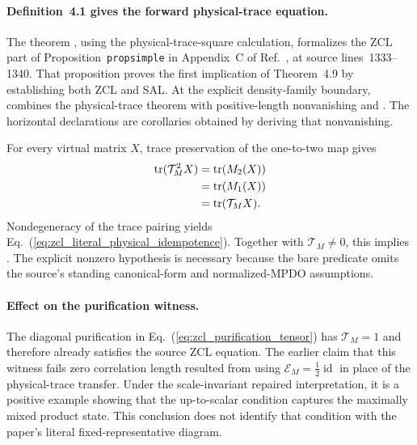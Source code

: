 \documentclass{article}
\begin{document}
\paragraph{Definition~4.1 gives the forward physical-trace equation.}
The theorem
, using the
physical-trace-square calculation, formalizes the ZCL part of
Proposition~\texttt{propsimple} in Appendix~C of
Ref.~\cite{Cirac2016MPDO_arXiv}, at source lines~1333--1340. That proposition
proves the first implication of Theorem~4.9 by establishing both ZCL and SAL.
At the explicit density-family boundary,
combines the physical-trace theorem with positive-length nonvanishing and
. The horizontal
declarations are corollaries obtained by deriving that nonvanishing.

For every virtual matrix $X$, trace preservation of the one-to-two map gives
\begin{align}
    \operatorname{tr}(\mathcal T_M^2X)
    &=\operatorname{tr}(M_2(X))
    \label{eq:zcl_trace_pairing_two_site}\\
    &=\operatorname{tr}(M_1(X))
    \label{eq:zcl_trace_preservation_step}\\
    &=\operatorname{tr}(\mathcal T_MX).
    \label{eq:zcl_trace_pairing_one_site}
\end{align}
Nondegeneracy of the trace pairing yields
Eq.~(\ref{eq:zcl_literal_physical_idempotence}). Together with
$\mathcal T_M\ne0$, this implies
. The explicit nonzero hypothesis is necessary
because the bare predicate  omits the source's standing
canonical-form and normalized-MPDO assumptions.

\paragraph{Effect on the purification witness.}
The diagonal purification in Eq.~(\ref{eq:zcl_purification_tensor}) has
$\mathcal T_M=1$ and therefore already satisfies the source ZCL equation. The
earlier claim that this witness fails zero correlation length resulted from
using $\mathcal E_M=\tfrac12\operatorname{id}$ in place of the physical-trace
transfer. Under the scale-invariant repaired interpretation, it is a positive
example showing that the up-to-scalar condition captures the maximally mixed
product state. This conclusion does not identify that condition with the
paper's literal fixed-representative diagram.
\end{document}
